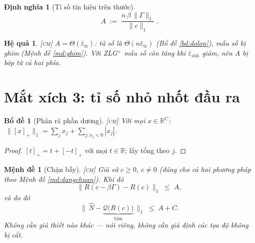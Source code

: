 \documentclass[11pt,a4paper]{article}
\newtheorem{bode}[dinhly]{Bổ đề}
\newtheorem{menhde}[dinhly]{Mệnh đề}
\newtheorem{hequa}[dinhly]{Hệ quả}
\newtheorem{dinhnghia}[dinhly]{Định nghĩa}
\theoremstyle{remark}
\newcommand{\R}{\mathbb{R}}
\newcommand{\pos}[1]{\left[#1\right]_+}
\newcommand{\quant}{\mathcal{Q}}
\newcommand{\epstr}{\bar\varepsilon_{\mathrm{tr}}}
\newcommand{\epsaux}{\bar\varepsilon_{\mathrm{aux}}}
\begin{document}
\begin{dinhnghia}[Tỉ số tín hiệu trên thước]
\label{dn:A}
\begin{equation}
A\;:=\;\frac{n\,\beta\,\|\Gamma\|_1}{\|c\|_1}\;.
\label{eq:A}
\end{equation}
\end{dinhnghia}

\begin{hequa}
\label{hq:Aeps}
\textsc{[cm]}\; $A=\Theta(\epstr)$: tử số là $\Theta(n\epstr)$ (Bổ đề
\ref{bd:dolon}), mẫu số bị ghim (Mệnh đề \ref{md:ghim}). Với ZLG$^+$ mẫu số
còn \emph{tăng} khi $\epsaux$ giảm, nên $A$ bị bóp từ cả hai phía.
\end{hequa}

\section{Mắt xích 3: tỉ số nhỏ nhốt đầu ra}
\label{sec:bay}

\begin{bode}[Phân rã phần dương]
\label{bd:phanra}
\textsc{[cm]}\; Với mọi $x\in\R^C$:
$\ \|\pos{x}\|_1=\sum_j x_j+\sum_{j:x_j<0}|x_j|$.
\end{bode}

\begin{proof}
$[t]_+=t+[-t]_+$ với mọi $t\in\R$; lấy tổng theo $j$.
\end{proof}

\begin{menhde}[Chặn bẫy]
\label{md:bay}
\textsc{[cm]}\; Giả sử $c\ge0$, $c\ne0$ (đúng cho cả hai phương pháp theo
Mệnh đề \ref{md:dangchuan}). Khi đó
\begin{equation}
\bigl\|R(c-\beta\Gamma)-R(c)\bigr\|_1\;\le\;A ,
\label{eq:dichchuyen}
\end{equation}
và do đó
\begin{equation}
\bigl\|\,\hat N-\underbrace{\quant\bigl(R(c)\bigr)}_{\text{tâm}}\,\bigr\|_1
\;\le\;A+C .
\label{eq:bay}
\end{equation}
Không cần giả thiết nào khác --- nói riêng, \emph{không} cần giả định các tọa
độ không bị cắt.
\end{menhde}
\end{document}
